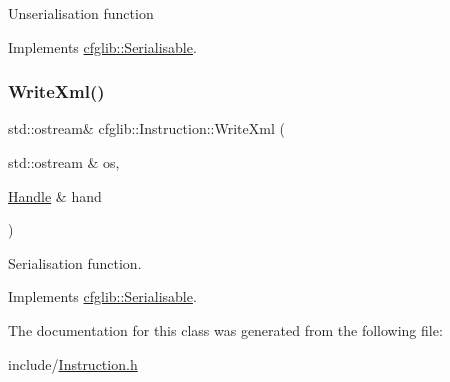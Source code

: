 Unserialisation function 

Implements \hyperlink{classcfglib_1_1Serialisable_a876d530446317872259356af9b016e13}{cfglib\+::\+Serialisable}.

\mbox{\label{classcfglib_1_1Instruction_a1775270fdbf4f48e63d75c1327b51aa6}} 
\subsubsection{\texorpdfstring{Write\+Xml()}{WriteXml()}}
{\footnotesize\ttfamily std\+::ostream\& cfglib\+::\+Instruction\+::\+Write\+Xml (\begin{DoxyParamCaption}\item[{std\+::ostream \&}]{os,  }\item[{\hyperlink{classcfglib_1_1Handle}{Handle} \&}]{hand }\end{DoxyParamCaption})\hspace{0.3cm}{\ttfamily [virtual]}}

Serialisation function. 

Implements \hyperlink{classcfglib_1_1Serialisable_aaeb80cc7397ad312e5ae34f39412ce42}{cfglib\+::\+Serialisable}.



The documentation for this class was generated from the following file\+:\begin{DoxyCompactItemize}
\item 
include/\hyperlink{Instruction_8h}{Instruction.\+h}\end{DoxyCompactItemize}
